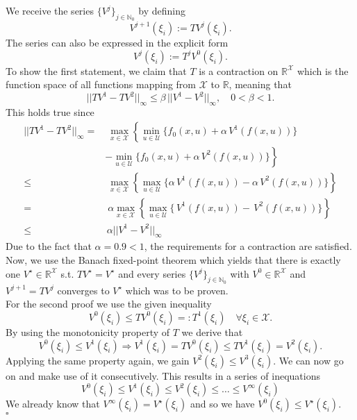 \documentclass[12pt,pdftex,a4paper]{scrartcl}
\newcommand{\set}[1]{\mathbb{#1}}
\begin{document}
\begin{enumerate}
	We receive the series $\{V^j\}_{j\in \set{N}_0}$ by defining 
	\begin{equation*}
		V^{j+1}(\xi_i) := TV^j(\xi_i).
	\end{equation*}
	The series can also be expressed in the explicit form
	\begin{equation*}
		V^j(\xi_i) := T^jV^0(\xi_i).
	\end{equation*}
	To show the first statement, we claim that $T$ is a contraction on $\set{R}^\mathcal{X}$ which is the function space of all functions mapping from $\mathcal{X}$ to $\set{R}$, meaning that
	\begin{equation*}
		||TV^1 - TV^2||_\infty \le \beta\,||V^1 - V^2||_\infty, \quad 0 < \beta < 1.
	\end{equation*}
	This holds true since
	\begin{align*}
		||TV^1 - TV^2||_\infty = & \;\max_{x\in\mathcal{X}}\left\{ \min_{u\in\mathcal{U}}\{ f_0(x,u) + \alpha\,V^1(f(x,u))\} \right. \\
		& \left. - \min_{u\in\mathcal{U}}\{ f_0(x,u) + \alpha\,V^2(f(x,u))\}\right\} \\
		\le & \;\max_{x\in\mathcal{X}}\left\{ \max_{u\in\mathcal{U}}\{ \alpha\,V^1(f(x,u)) - \alpha\,V^2(f(x,u))\}\right\} \\
		= & \;\alpha \max_{x\in\mathcal{X}}\left\{ \max_{u\in\mathcal{U}}\{ \,V^1(f(x,u)) -\,V^2(f(x,u))\}\right\} \\
		\le & \,\alpha ||V^1 - V^2||_\infty
	\end{align*}
	Due to the fact that $\alpha = 0.9 < 1$, the requirements for a contraction are satisfied. Now, we use the Banach fixed-point theorem which yields that there is exactly one $V^\star \in \set{R}^\mathcal{X}$ s.t. $TV^\star = V^\star$ and every series $\{V^j\}_{j\in \set{N}_0}$ with $V^0 \in \set{R}^\mathcal{X}$ and $V^{j+1} = TV^j$ converges to $V^\star$ which was to be proven.\\
	For the second proof we use the given inequality
	\begin{equation*}
		V^0(\xi_i) \le TV^0(\xi_i) =: T^1(\xi_i) \quad \forall\xi_i\in\mathcal{X}.
	\end{equation*}
	By using the monotonicity property of $T$ we derive that
	\begin{equation*}
		V^0(\xi_i) \le V^1(\xi_i) \Rightarrow V^1(\xi_i) = TV^0(\xi_i) \le TV^1(\xi_i) = V^2(\xi_i).
	\end{equation*}
	Applying the same property again, we gain $V^2(\xi_i) \le V^3(\xi_i)$. We can now go on and make use of it consecutively. This results in a series of inequations
	\begin{equation*}
		V^0(\xi_i) \le V^1(\xi_i) \le V^2(\xi_i) \le \ldots \le V^\infty(\xi_i)
	\end{equation*}
	We already know that $V^\infty(\xi_i) = V^\star(\xi_i)$ and so we have $V^0(\xi_i) \le V^\star(\xi_i)$.\\
	\hspace*{133mm}$\square$
	

\end{enumerate}
\end{document}
